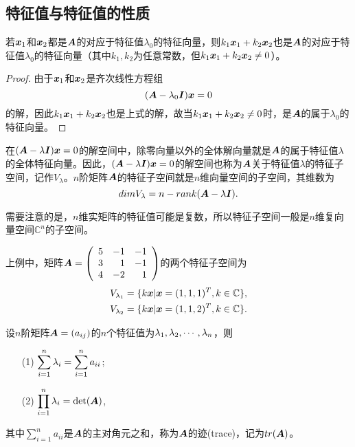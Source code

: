 \subsection{特征值与特征值的性质}


\begin{frame}[fragile]\ft{\subsecname}  
\begin{dingli}
  若${\boldsymbol{x}}_1$和${\boldsymbol{x}}_2$都是$\boldsymbol{A}$的对应于特征值$\lambda_0$的特征向量，则$k_1{\boldsymbol{x}}_1+k_2{\boldsymbol{x}}_2$也是$\boldsymbol{A}$的对应于特征值$\lambda_0$的特征向量（其中$k_1,k_2$为任意常数，但$k_1{\boldsymbol{x}}_1+k_2{\boldsymbol{x}}_2\ne 0$）。
\end{dingli}
\end{frame}

\begin{frame}[fragile]\ft{\subsecname}  
\begin{proof}
  由于${\boldsymbol{x}}_1$和${\boldsymbol{x}}_2$是齐次线性方程组
  $$
  (\boldsymbol{A}-\lambda_0\boldsymbol{I}){\boldsymbol{x}}=0
  $$
  的解，因此$k_1{\boldsymbol{x}}_1+k_2{\boldsymbol{x}}_2$也是上式的解，故当$k_1{\boldsymbol{x}}_1+k_2{\boldsymbol{x}}_2\ne0$时，是$\boldsymbol{A}$的属于$\lambda_0$的特征向量。
\end{proof}
\end{frame}

\begin{frame}[fragile]\ft{\subsecname}  
 在$(\boldsymbol{A}-\lambda\boldsymbol{I}){\boldsymbol{x}}=0$的解空间中，除零向量以外的全体解向量就是$\boldsymbol{A}$的属于特征值$\lambda$的全体特征向量。因此，$(\boldsymbol{A}-\lambda\boldsymbol{I}){\boldsymbol{x}}=0$的解空间也称为$\boldsymbol{A}$关于特征值$\lambda$的特征子空间，记作$V_\lambda$。$n$阶矩阵$\boldsymbol{A}$的特征子空间就是$n$维向量空间的子空间，其维数为
 $$
 dim V_\lambda = n - rank(\boldsymbol{A}-\lambda \boldsymbol{I}).
 $$
\end{frame}

\begin{frame}[fragile]\ft{\subsecname}  
  需要注意的是，$n$维实矩阵的特征值可能是复数，所以特征子空间一般是$n$维复向量空间$\mathbb C^n$的子空间。

上例中，矩阵$\boldsymbol{A}=\left(
    \begin{array}{rrr}
      5&-1&-1\\
      3&1&-1\\
      4&-2&1
    \end{array}
  \right)$的两个特征子空间为
  $$
  \begin{aligned}
    V_{\lambda_1}=\{k{\boldsymbol{x}} | {\boldsymbol{x}} = (1,1,1)^T, k \in \mathbb C\},\\
    V_{\lambda_2}=\{k{\boldsymbol{x}} | {\boldsymbol{x}} = (1,1,2)^T, k \in \mathbb C\}.
  \end{aligned}
  $$
\end{frame}

\begin{frame}[fragile]\ft{\subsecname}  

\begin{dingli}
  设$n$阶矩阵$\boldsymbol{A}=(a_{ij})$的$n$个特征值为$\lambda_1,\lambda_2,\cdots,\lambda_n$，则
  \begin{itemize}
  \item[(1)] $\displaystyle \sum_{i=1}^n\lambda_i=\sum_{i=1}^na_{ii}$;
  \item[(2)] $\displaystyle \prod_{i=1}^n\lambda_i=\mathrm{det}(\boldsymbol{A})$,         
  \end{itemize}
  其中$\sum_{i=1}^na_{ii}$是$\boldsymbol{A}$的主对角元之和，称为$\boldsymbol{A}$的迹(trace)，记为$tr(\boldsymbol{A})$。
\end{dingli}
\end{frame}

